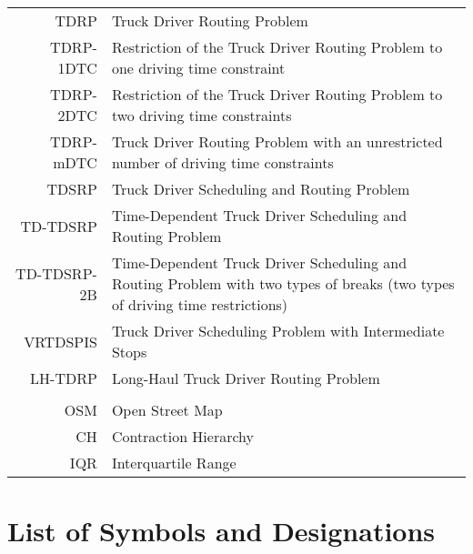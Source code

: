 \begin{tabular}{rp{}}
	TDRP        & Truck Driver Routing Problem                                                                                                 \\
	TDRP-1DTC   & Restriction of the Truck Driver Routing Problem to one driving time constraint                                               \\
	TDRP-2DTC   & Restriction of the Truck Driver Routing Problem to two driving time constraints                                              \\
	TDRP-mDTC   & Truck Driver Routing Problem with an unrestricted number of driving time constraints                                         \\
	TDSRP       & Truck Driver Scheduling and Routing Problem                                                                                  \\
	TD-TDSRP    & Time-Dependent Truck Driver Scheduling and Routing Problem                                                                   \\
	TD-TDSRP-2B & Time-Dependent Truck Driver Scheduling and Routing Problem with two types of breaks (two types of driving time restrictions) \\
	VRTDSPIS    & Truck Driver Scheduling Problem with Intermediate Stops                                                                      \\
	LH-TDRP     & Long-Haul Truck Driver Routing Problem                                                                                       \\
	\vspace{2\baselineskip}                                                                                                                    \\
	OSM         & Open Street Map                                                                                                              \\
	CH          & Contraction Hierarchy                                                                                                        \\
	IQR         & Interquartile Range
\end{tabular}



\section{List of Symbols and Designations}
\label{app:symbols}

